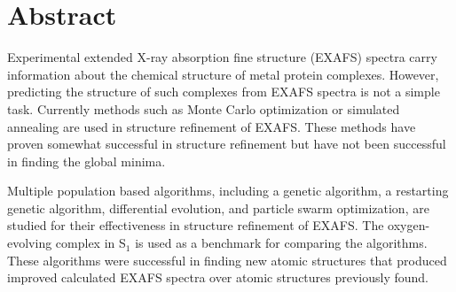 \thispagestyle{empty}
\section*{Abstract}
\begin{doublespace}
Experimental extended X-ray absorption fine structure (EXAFS) spectra carry information about the chemical structure of metal protein complexes. However, predicting the structure of such complexes from EXAFS spectra is not a simple task. Currently methods such as Monte Carlo optimization or simulated annealing are used in structure refinement of EXAFS. These methods have proven somewhat successful in structure refinement but have not been successful in finding the global minima.

Multiple population based algorithms, including a genetic algorithm, a restarting genetic algorithm, differential evolution, and particle swarm optimization, are studied for their effectiveness in structure refinement of EXAFS. The oxygen-evolving complex in S$_{1}$ is used as a benchmark for comparing the algorithms. These algorithms were successful in finding new atomic structures that produced improved calculated EXAFS spectra over atomic structures previously found.

\end{doublespace}   

